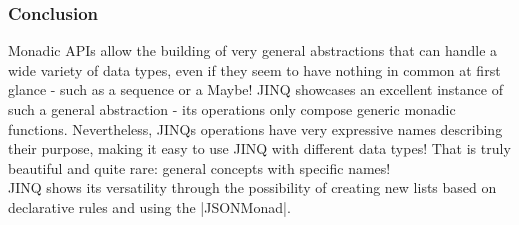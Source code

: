 \subsubsection{Conclusion} %
\label{subsub:Conclusion}
Monadic APIs allow the building of very general abstractions that can handle a
wide variety of data types, even if they seem to have nothing in common at
first glance - such as a sequence or a Maybe! JINQ showcases an excellent
instance of such a general abstraction - its operations only compose generic
monadic functions. Nevertheless, JINQs operations have very expressive names
describing their purpose, making it easy to use JINQ with different data types!
That is truly beautiful and quite rare: general concepts with specific
names!\\ 
JINQ shows its versatility through the possibility of creating new lists based
on declarative rules and using the |JSONMonad|.
